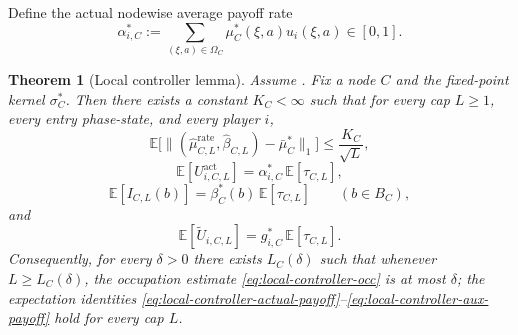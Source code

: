 \documentclass[12pt]{article}
\newtheorem{theorem}{Theorem}[section]
\theoremstyle{definition}
\newcommand{\E}{\mathbb{E}}
\newcommand{\1}{\mathbf{1}}
\begin{document}
Define the actual nodewise average payoff rate
\begin{equation}
\label{eq:alpha-node}
\alpha_{i,C}^*
:=
\sum_{(\xi,a)\in\Omega_C}\mu_C^*(\xi,a)u_i(\xi,a)\in[0,1].
\end{equation}

\begin{theorem}[Local controller lemma]
\label{thm:local-controller}
Assume . Fix a node $C$ and the fixed-point kernel
$\sigma_C^*$. Then there exists a constant $K_C<\infty$ such that for every cap
$L\ge 1$, every entry phase-state, and every player $i$,
\begin{equation}
\label{eq:local-controller-occ}
\E\bigl[\|(\widehat\mu_{C,L}^{\mathrm{rate}},\widehat\beta_{C,L})-\bar\mu_C^*\|_1\bigr]
\le \frac{K_C}{\sqrt L},
\end{equation}
\begin{equation}
\label{eq:local-controller-actual-payoff}
\E[U_{i,C,L}^{\mathrm{act}}]
=
\alpha_{i,C}^*\,\E[\tau_{C,L}],
\end{equation}
\begin{equation}
\label{eq:local-controller-exit-count}
\E[I_{C,L}(b)]
=
\beta_C^*(b)\,\E[\tau_{C,L}]
\qquad (b\in B_C),
\end{equation}
and
\begin{equation}
\label{eq:local-controller-aux-payoff}
\E[\widetilde U_{i,C,L}]
=
g_{i,C}^*\,\E[\tau_{C,L}].
\end{equation}
Consequently, for every $\delta>0$ there exists $L_C(\delta)$ such that whenever
$L\ge L_C(\delta)$, the occupation estimate \eqref{eq:local-controller-occ} is at
most $\delta$; the expectation identities
\eqref{eq:local-controller-actual-payoff}--\eqref{eq:local-controller-aux-payoff}
hold for every cap $L$.
\end{theorem}
\end{document}
